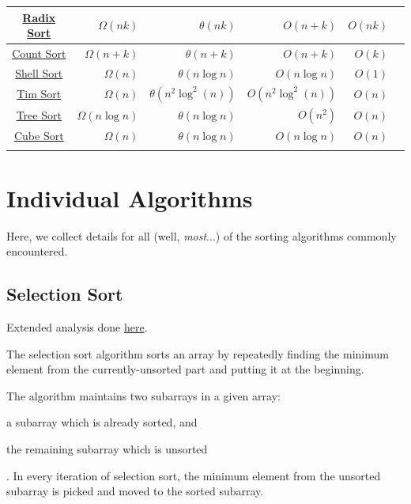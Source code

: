 \documentclass[12pt]{article}
\begin{document}
\begin{center}
\begin{xtabular}{!{\vrule width 2pt}C!{\vrule width 2pt}D|D|D!{\vrule width 2pt}D!{\vrule width 2pt}G!{\vrule width 2pt}}
		\hline
		\hyperref[sec:RadSort]{Radix Sort} & $\Omega(nk)$ & $\theta(nk)$ & $O(n+k)$ & $O(nk)$ & \\
		\hline
		\hyperref[sec:CntSort]{Count Sort} & $\Omega(n+k)$ & $\theta(n+k)$ & $O(n+k)$ & $O(k)$ & \\
		\hline
		\hyperref[sec:ShSort]{Shell Sort} & $\Omega(n)$ & $\theta(n\log n)$ & $O(n\log n)$ & $O(1)$ & \\
		\hline
		\hyperref[sec:TimSort]{Tim Sort} & $\Omega(n)$ & $\theta(n^2\log^2(n))$ & $O(n^2\log^2(n))$ & $O(n)$ & \\
		\hline
		\hyperref[sec:TrSort]{Tree Sort} & $\Omega(n\log n)$ & $\theta(n\log n)$ & $O(n^2)$ & $O(n)$ & \\
		\hline
		\hyperref[sec:CubeSort]{Cube Sort} & $\Omega(n)$ & $\theta(n\log n)$ & $O(n\log n)$ & $O(n)$ & \\
	\end{xtabular}
	\end{center}
	
	\section*{Individual Algorithms}
	
	Here, we collect details for all (well, \textit{most}...) of the sorting algorithms commonly encountered.
	
	\subsection*{Selection Sort}
	\label{sec:SelSort}
	
	Extended analysis done \href{https://www.geeksforgeeks.org/selection-sort/}{here}.
	
	The selection sort algorithm sorts an array by repeatedly finding the minimum element from the currently-unsorted part and putting it at the beginning. 
	
	The algorithm maintains two subarrays in a given array: \begin{enumerate*}[label=(\roman*)]\item a subarray which is already sorted, and \item the remaining subarray which is unsorted\end{enumerate*}. In every iteration of selection sort, the minimum element from the unsorted subarray is picked and moved to the sorted subarray.
	
\end{document}
